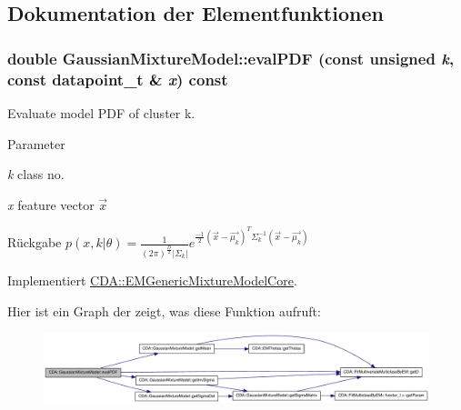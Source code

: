 \subsection{Dokumentation der Elementfunktionen}
\hypertarget{classCDA_1_1GaussianMixtureModel_ad89163c9bc3bdd8565a1fdcd9206d762}{
\subsubsection[{evalPDF}]{\setlength{\rightskip}{0pt plus 5cm}double GaussianMixtureModel::evalPDF (const unsigned {\em k}, \/  const {\bf datapoint\_\-t} \& {\em x}) const}}
\label{classCDA_1_1GaussianMixtureModel_ad89163c9bc3bdd8565a1fdcd9206d762}


Evaluate model PDF of cluster k. 


\begin{DoxyParams}{Parameter}
\item[{\em k}]class no. \item[{\em x}]feature vector $\vec{x}$\end{DoxyParams}
\begin{DoxyReturn}{Rückgabe}
$p(x,k\vert\theta) = \frac{1}{(2\pi)^{\frac{D}{2}}\left|\Sigma_k\right|}e^{\frac{-1}{2}(\vec{x}-\vec{\mu_k})^T\Sigma_k^{-1}(\vec{x}-\vec{\mu_k})}$ 
\end{DoxyReturn}


Implementiert \hyperlink{classCDA_1_1EMGenericMixtureModelCore_a3f291b20f5345b1e302bf46338d2f5f3}{CDA::EMGenericMixtureModelCore}.



Hier ist ein Graph der zeigt, was diese Funktion aufruft:\nopagebreak
\begin{figure}[H]
\begin{center}
\leavevmode
\includegraphics[width=420pt]{classCDA_1_1GaussianMixtureModel_ad89163c9bc3bdd8565a1fdcd9206d762_cgraph}
\end{center}
\end{figure}




